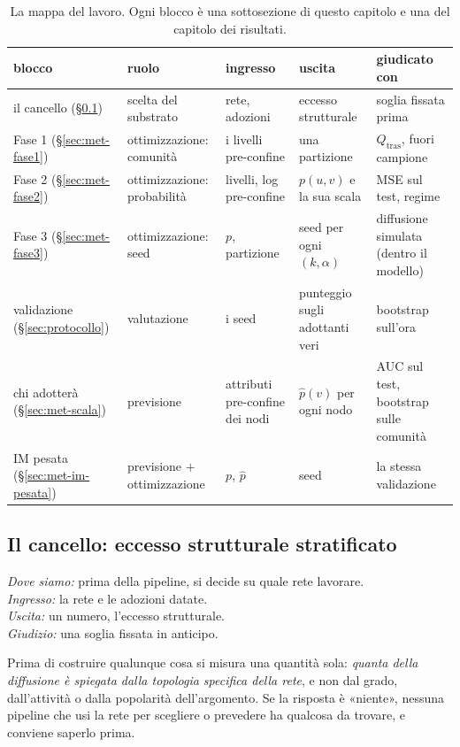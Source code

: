 \documentclass[11pt,a4paper]{article}
\newcommand{\Qtras}{Q_{\mathrm{tras}}}
\newcommand{\phat}{\hat{p}}
\newcommand{\dovesiamo}[4]{\par\noindent\begingroup\small\color{black!55}
  \textit{Dove siamo:} #1\\
  \textit{Ingresso:} #2\\
  \textit{Uscita:} #3\\
  \textit{Giudizio:} #4\par\endgroup\medskip}
\begin{document}
\begin{table}[htbp]
  \centering\small
  \caption{La mappa del lavoro. Ogni blocco è una sottosezione di questo capitolo e una del capitolo dei risultati.}
  \label{tab:mappa}
  \begin{tabular}{>{\raggedright\arraybackslash}p{}>{\raggedright\arraybackslash}p{}>{\raggedright\arraybackslash}p{}>{\raggedright\arraybackslash}p{}>{\raggedright\arraybackslash}p{}}
    \toprule
    blocco & ruolo & ingresso & uscita & giudicato con \\
    \midrule
    il cancello (\S\ref{sec:met-cancello}) & scelta del substrato & rete, adozioni & eccesso strutturale & soglia fissata prima \\
    Fase 1 (\S\ref{sec:met-fase1}) & ottimizzazione: comunità & i livelli pre-confine & una partizione & $\Qtras$, fuori campione \\
    Fase 2 (\S\ref{sec:met-fase2}) & ottimizzazione: probabilità & livelli, log pre-confine & $p(u,v)$ e la sua scala & MSE sul test, regime \\
    Fase 3 (\S\ref{sec:met-fase3}) & ottimizzazione: seed & $p$, partizione & seed per ogni $(k,\alpha)$ & diffusione simulata (dentro il modello) \\
    validazione (\S\ref{sec:protocollo}) & valutazione & i seed & punteggio sugli adottanti veri & bootstrap sull'ora \\
    chi adotterà (\S\ref{sec:met-scala}) & previsione & attributi pre-confine dei nodi & $\phat(v)$ per ogni nodo & AUC sul test, bootstrap sulle comunità \\
    IM pesata (\S\ref{sec:met-im-pesata}) & previsione $+$ ottimizzazione & $p$, $\phat$ & seed & la stessa validazione \\
    \bottomrule
  \end{tabular}
\end{table}

\subsection{Il cancello: eccesso strutturale stratificato}
\label{sec:met-cancello}
\dovesiamo{prima della pipeline, si decide su quale rete lavorare.}{la rete e le adozioni datate.}{un numero, l'eccesso strutturale.}{una soglia fissata in anticipo.}
Prima di costruire qualunque cosa si misura una quantità sola: \emph{quanta della diffusione è spiegata dalla topologia specifica della rete}, e non dal grado, dall'attività o dalla popolarità dell'argomento. Se la risposta è «niente», nessuna pipeline che usi la rete per scegliere o prevedere ha qualcosa da trovare, e conviene saperlo prima.
\end{document}
